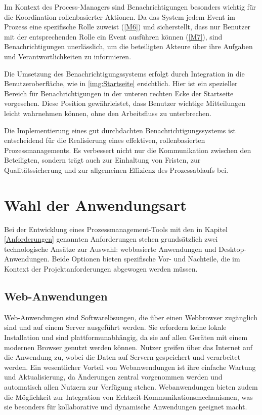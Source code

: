 Im Kontext des Process-Managers sind Benachrichtigungen besonders wichtig für die Koordination rollenbasierter Aktionen. Da das System jedem Event im Prozess eine spezifische Rolle zuweist (\ref{M6}) und sicherstellt, dass nur Benutzer mit der entsprechenden Rolle ein Event ausführen können (\ref{M7}), sind Benachrichtigungen unerlässlich, um die beteiligten Akteure über ihre Aufgaben und Verantwortlichkeiten zu informieren.

Die Umsetzung des Benachrichtigungssystems erfolgt durch Integration in die Benutzeroberfläche, wie in \autoref{img:Startseite} ersichtlich. Hier ist ein spezieller Bereich für Benachrichtigungen in der unteren rechten Ecke der Startseite vorgesehen. Diese Position gewährleistet, dass Benutzer wichtige Mitteilungen leicht wahrnehmen können, ohne den Arbeitsfluss zu unterbrechen.

Die Implementierung eines gut durchdachten Benachrichtigungssystems ist entscheidend für die Realisierung eines effektiven, rollenbasierten Prozessmanagements. Es verbessert nicht nur die Kommunikation zwischen den Beteiligten, sondern trägt auch zur Einhaltung von Fristen, zur Qualitätssicherung und zur allgemeinen Effizienz des Prozessablaufs bei.

\newpage
\section{Wahl der Anwendungsart}
Bei der Entwicklung eines Prozessmanagement-Tools mit den in Kapitel \ref{Anforderungen} genannten Anforderungen stehen grundsätzlich zwei technologische Ansätze zur Auswahl: webbasierte Anwendungen und Desktop-Anwendungen. Beide Optionen bieten spezifische Vor- und Nachteile, die im Kontext der Projektanforderungen abgewogen werden müssen.  

\subsection*{Web-Anwendungen}
Web-Anwendungen sind Softwarelösungen, die über einen Webbrowser zugänglich sind und auf einem Server ausgeführt werden. Sie erfordern keine lokale Installation und sind plattformunabhängig, da sie auf allen Geräten mit einem modernen Browser genutzt werden können. Nutzer greifen über das Internet auf die Anwendung zu, wobei die Daten auf Servern gespeichert und verarbeitet werden. Ein wesentlicher Vorteil von Webanwendungen ist ihre einfache Wartung und Aktualisierung, da Änderungen zentral vorgenommen werden und automatisch allen Nutzern zur Verfügung stehen. Webanwendungen bieten zudem die Möglichkeit zur Integration von Echtzeit-Kommunikationsmechanismen, was sie besonders für kollaborative und dynamische Anwendungen geeignet macht.

